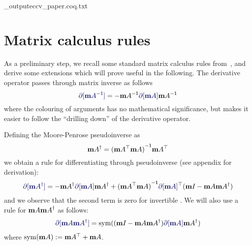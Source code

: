 \documentclass[runningheads]{llncs}
\def\eqlabel#1{\label{eq:#1}}
\def\tr{^\top}
\begin{document}
\coq_output{eccv_paper.coq.txt}

\section{Matrix calculus rules}
As a preliminary step, we recall some standard matrix calculus rules from~\cite{minka00}, and derive some extensions which will prove useful in the following.   The derivative operator passes through matrix inverse as follows
\begin{equation}
\diff[\inv \mA] = -\inv \mA \diff[\mA] \inv \mA
\end{equation}
where the colouring of arguments has no mathematical significance, but makes it easier to follow the ``drilling down'' of the derivative operator.  

Defining the Moore-Penrose pseudoinverse as
\begin{equation}
\pinv \mA = \inv{(\mA\tr \mA)}\mA\tr
\end{equation}
we obtain a rule for differentiating through pseudoinverse (see appendix for derivation):
\begin{align}
\diff[\pinv \mA] = -\pinv \mA \diff[\mA] \pinv \mA +
\inv{(\mA\tr\mA)}\diff[\mA]\tr(\Id{}-\mA\pinv\mA)
\eqlabel{diffpinv}
\end{align}
and we observe that the second term is zero for invertible \mA.  We will also use a rule for $\mathbf m A {{\mathbf m A}^\dagger}$ as follows:
\begin{align}
\diff[\mA \pinv \mA] = \sym((\Id{} - \mA\pinv \mA) \diff[\mA] \pinv \mA)
\end{align}
where $\sym(\mA) := \mA\tr + \mA$. 

\end{document}
